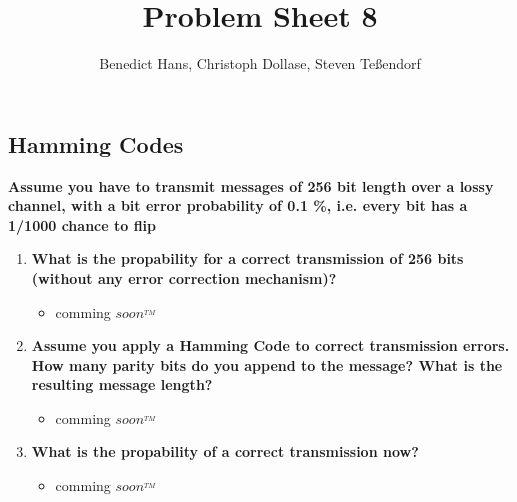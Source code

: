 \documentclass[a4paper,12pt]{article}
\author{Benedict Hans, Christoph Dollase, Steven Te\ss endorf}
\title{ \textbf{Problem Sheet 8}}
\begin{document}
	 
	\maketitle	 %
	
	\subsection{Hamming Codes}
	\textbf{Assume you have to transmit messages of 256 bit length over a lossy channel, with a bit error probability of 0.1 \%, i.e.  every bit has a 1/1000 chance to flip}
	\begin{enumerate}[label=(\roman*),itemsep=0pt]
		\item \textbf{What is the propability for a correct transmission of 256 bits (without any error correction mechanism)?}
		\begin{itemize}[itemsep=0pt]
			\item comming $soon^{_{TM}}$
		\end{itemize}
		\item \textbf{Assume you apply a Hamming Code to correct transmission errors. How many parity bits do you append to the message?  What is the resulting message length?}
		\begin{itemize}[itemsep=0pt]
			\item comming $soon^{_{TM}}$
		\end{itemize}
		\item \textbf{What is the propability of a correct transmission now?}
		\begin{itemize}[itemsep=0pt]
			\item comming $soon^{_{TM}}$
		\end{itemize}
	\end{enumerate}
	
	
\end{document}
